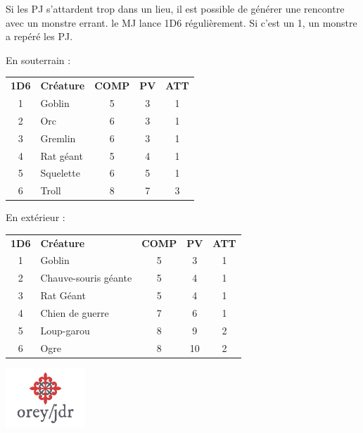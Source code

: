 \documentclass[a4paper, 11pt, twoside]{article}
\begin{document}
Si les PJ s'attardent trop dans un lieu, il est possible de générer une rencontre avec un monstre errant. le MJ lance 1D6 régulièrement. Si c'est un 1, un monstre a repéré les PJ.

\newpage

En souterrain :

\begin{longtable}{clccc}
\textbf{1D6} & \textbf{Créature} & \textbf{COMP} & \textbf{PV} & \textbf{ATT}\\
1 & Goblin & 5 & 3 & 1\\
2 & Orc & 6 & 3 & 1\\
3 & Gremlin & 6 & 3 & 1\\
4 & Rat géant & 5 & 4 & 1\\
5 & Squelette & 6 & 5 & 1\\
6 & Troll & 8 & 7 & 3\\
\end{longtable}

En extérieur :

\begin{longtable}{clccc}
\textbf{1D6} & \textbf{Créature} & \textbf{COMP} & \textbf{PV} & \textbf{ATT}\\
1 & Goblin & 5 & 3 & 1\\
2 & Chauve-souris géante & 5 & 4 & 1\\
3 & Rat Géant & 5 & 4 & 1\\
4 & Chien de guerre & 7 & 6 & 1\\
5 & Loup-garou & 8 & 9 & 2\\
6 & Ogre & 8 & 10 & 2\\
\end{longtable}


\vfill

\begin{center}
\includegraphics[width=3cm]{logo-orey-big.png}
\end{center}
\end{document}

